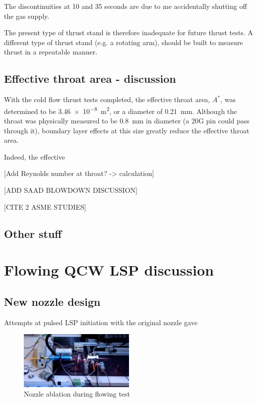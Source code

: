 
        The discontinuities at 10 and 35 seconds are due to me accidentally shutting off the gas supply.

        The present type of thrust stand is therefore inadequate for future thrust tests. A different type of thrust stand (e.g. a rotating arm), should be built to measure thrust in a repeatable manner.

    \subsection{Effective throat area - discussion}
            
        With the cold flow thrust tests completed, the effective throat area, $A^*$, was determined to be \qty{3.46e-8}{m^2}, or a diameter of \qty{0.21}{mm}. Although the throat was physically measured to be \qty{0.8}{mm} in diameter (a 20G pin could pass through it), boundary layer effects at this size greatly reduce the effective throat area.

        Indeed, the effective

        [Add Reynolds number at throat? -> calculation]

        [ADD SAAD BLOWDOWN DISCUSSION]

        [CITE 2 ASME STUDIES]

    \subsection*{Other stuff}

\section{Flowing QCW LSP discussion}

    \subsection{New nozzle design}

    Attempts at pulsed LSP initiation with the original nozzle gave 

    \begin{figure}[!ht]
        \centering
        \includegraphics[width=0.5\textwidth]{assets/5 discussion/Nozzle ablation.png}
        \caption{Nozzle ablation during flowing test}
        \label{fig:nozzle ablation}
    \end{figure}

